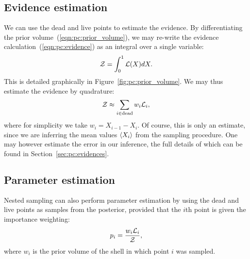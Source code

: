 \subsection{Evidence estimation}
\label{sec:pc:ev_es}
We can use the dead and live points to estimate the evidence. By differentiating the prior volume~(\ref{eqn:pc:prior_volume}), we may re-write the evidence calculation~(\ref{eqn:pc:evidence}) as an integral over a single variable:
%
\begin{equation}
  \mathcal{Z} = \int_0^1 \mathcal{L}(X)dX.
  \label{eqn:pc:evidence_short}
\end{equation}
%
This is detailed graphically in Figure~\ref{fig:pc:prior_volume}. We may thus estimate the evidence by quadrature:
%
\begin{equation}
  \mathcal{Z} \approx \sum_{i\in\mathrm{dead}} w_i \mathcal{L}_i,
  \label{eqn:pc:quadrature}
\end{equation}
%
where for simplicity we take $w_i = X_{i-1}-X_{i}$. Of course, this is only an estimate, since we are inferring the mean values ${\left\langle{X_i}\right\rangle}$ from the sampling procedure. One may however estimate the error in our inference, the full details of which can be found in Section~\ref{sec:pc:evidences}.

\subsection{Parameter estimation}
\label{sec:pc:param_es}
Nested sampling can also perform parameter estimation by using the dead and live points as samples from the posterior, provided that the $i$th point is given the importance weighting:
\begin{equation}
  p_i = \frac{w_i\mathcal{L}_i}{\mathcal{Z}},
  \label{eqn:pc:importance_weighting}
\end{equation}
where $w_i$ is the prior volume of the shell in which point $i$ was sampled. 

